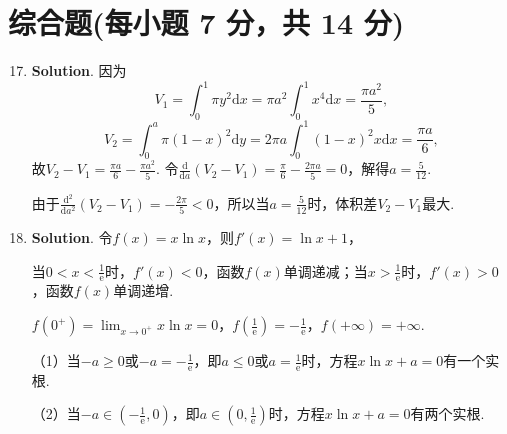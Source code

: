 \documentclass[../main.tex]{subfiles}
\begin{document}
\section{综合题(每小题 7 分，共 14 分)}
\begin{enumerate}
    \setcounter{enumi}{16}
    \item \textbf{Solution}. 因为
          \[
              V_{1} = \int_{0}^{1}\pi y^{2} \mathrm{d}x = \pi
              a^{2}\int_{0}^{1}x^{4} \mathrm{d}x = \frac{\pi a^{2}}{5},
          \]
          \[
              V_{2} = \int_{0}
              ^{a}\pi (1-x)^{2} \mathrm{d}y = 2\pi a \int_{0}^{1}(1-x)^{2} x \mathrm{d}x =
              \frac{\pi a}{6},
          \]
          故$V_{2} - V_{1} = \frac{\pi a}{6}- \frac{\pi a^{2}}{5}$. 令$\frac{\mathrm{d}}{\mathrm{d}
                  a}(V_{2} - V_{1}) = \frac{\pi}{6}- \frac{2\pi a}{5}= 0$，解得$a=\frac{5}{12}$.

          由于$\frac{\mathrm{d}^{2}}{\mathrm{d}a^{2}}(V_{2} - V_{1}) = -\frac{2\pi}{5}
              < 0$，所以当$a=\frac{5}{12}$时，体积差$V_{2} - V_{1}$最大.

    \item \textbf{Solution}. 令$f(x)=x\ln x$，则$f'(x)=\ln x + 1$，

          当$0<x<\frac{1}{\mathrm{e}}$时，$f'(x)<0$，函数$f(x)$单调递减；当$x>\frac{1}{\mathrm{e}}$时，$f
              '(x)>0$，函数$f(x)$单调递增.

          $f(0^{+}) = \lim_{x\to0^+}x\ln x = 0$，$f\left(\frac{1}{\mathrm{e}}\right) =
              -\frac{1}{\mathrm{e}}$，$f(+\infty) = +\infty$.

          （1）当$-a\geq0$或$-a = -\frac{1}{\mathrm{e}}$，即$a\leq0$或$a = \frac{1}{\mathrm{e}}$时，方程$x
              \ln x + a = 0$有一个实根.

          （2）当$-a\in\left(-\frac{1}{\mathrm{e}},0\right)$，即$a\in\left(0,\frac{1}{\mathrm{e}}
              \right)$时，方程$x\ln x + a = 0$有两个实根.
\end{enumerate}
\end{document}

